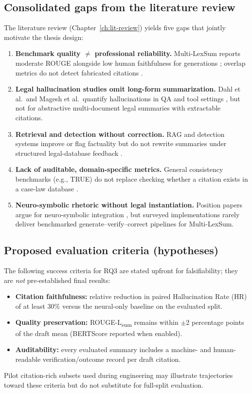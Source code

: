 \subsection{Consolidated gaps from the literature review}
The literature review (Chapter~\ref{ch:lit-review}) yields five gaps that jointly motivate the thesis design:
\begin{enumerate}
  \item \textbf{Benchmark quality $\neq$ professional reliability.} Multi-LexSum reports moderate ROUGE alongside low human faithfulness for generations \cite{shen2022multilexsum}; overlap metrics do not detect fabricated citations \cite{maynez2020faithfulness,pagnoni2021factuality}.
  \item \textbf{Legal hallucination studies omit long-form summarization.} Dahl et al.\ and Magesh et al.\ quantify hallucinations in QA and tool settings \cite{dahl2024largelegalfictions,magesh2025hallucinationfree}, but not for abstractive multi-document legal summaries with extractable citations.
  \item \textbf{Retrieval and detection without correction.} RAG and detection systems improve or flag factuality but do not rewrite summaries under structured legal-database feedback \cite{lewis2020rag,noel2025hallugraph,manakul2023selfcheckgpt}.
  \item \textbf{Lack of auditable, domain-specific metrics.} General consistency benchmarks (e.g., TRUE) do not replace checking whether a citation exists in a case-law database \cite{honovich2022true}.
  \item \textbf{Neuro-symbolic rhetoric without legal instantiation.} Position papers argue for neuro-symbolic integration \cite{kautz2022thirdaisummer}, but surveyed implementations rarely deliver benchmarked generate--verify--correct pipelines for Multi-LexSum.
\end{enumerate}

\subsection{Proposed evaluation criteria (hypotheses)}
The following success criteria for RQ3 are stated upfront for falsifiability; they are \emph{not} pre-established final results:
\begin{itemize}
  \item \textbf{Citation faithfulness:} relative reduction in paired Hallucination Rate (HR) of at least 30\% versus the neural-only baseline on the evaluated split.
  \item \textbf{Quality preservation:} ROUGE-L\textsubscript{sum} remains within $\pm$2 percentage points of the draft mean (BERTScore reported when enabled).
  \item \textbf{Auditability:} every evaluated summary includes a machine- and human-readable verification/outcome record per draft citation.
\end{itemize}

Pilot citation-rich subsets used during engineering may illustrate trajectories toward these criteria but do not substitute for full-split evaluation.
